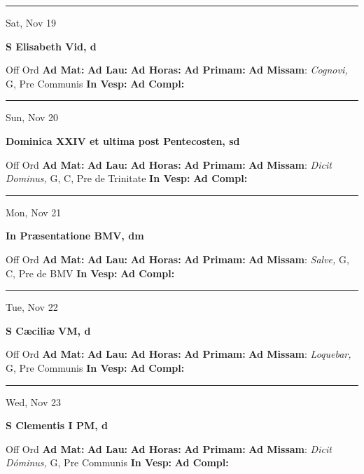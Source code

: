 \documentclass[letterpaper, 10pt]{article}
\begin{document}
\hrule
\begin{center}
Sat, Nov 19
\end{center}\textbf{ \large S Elisabeth Vid, \textnormal{\normalsize d}}
\begin{justify}
Off Ord
\textbf{Ad Mat: }
\textbf{Ad Lau: }
\textbf{Ad Horas: }
\textbf{Ad Primam: }
\textbf{Ad Missam}: \textit{Cognovi,} G, Pre Communis
\textbf{In Vesp: }
\textbf{Ad Compl: }\end{justify}



\hrule
\begin{center}
Sun, Nov 20
\end{center}\textbf{ \large Dominica XXIV et ultima post Pentecosten, \textnormal{\normalsize sd}}
\begin{justify}
Off Ord
\textbf{Ad Mat: }
\textbf{Ad Lau: }
\textbf{Ad Horas: }
\textbf{Ad Primam: }
\textbf{Ad Missam}: \textit{Dicit Dominus,} G, C, Pre de Trinitate
\textbf{In Vesp: }
\textbf{Ad Compl: }\end{justify}



\hrule
\begin{center}
Mon, Nov 21
\end{center}\textbf{ \large In Præsentatione BMV, \textnormal{\normalsize dm}}
\begin{justify}
Off Ord
\textbf{Ad Mat: }
\textbf{Ad Lau: }
\textbf{Ad Horas: }
\textbf{Ad Primam: }
\textbf{Ad Missam}: \textit{Salve,} G, C, Pre de BMV
\textbf{In Vesp: }
\textbf{Ad Compl: }\end{justify}



\hrule
\begin{center}
Tue, Nov 22
\end{center}\textbf{ \large S Cæciliæ VM, \textnormal{\normalsize d}}
\begin{justify}
Off Ord
\textbf{Ad Mat: }
\textbf{Ad Lau: }
\textbf{Ad Horas: }
\textbf{Ad Primam: }
\textbf{Ad Missam}: \textit{Loquebar,} G, Pre Communis
\textbf{In Vesp: }
\textbf{Ad Compl: }\end{justify}



\hrule
\begin{center}
Wed, Nov 23
\end{center}\textbf{ \large S Clementis I PM, \textnormal{\normalsize d}}
\begin{justify}
Off Ord
\textbf{Ad Mat: }
\textbf{Ad Lau: }
\textbf{Ad Horas: }
\textbf{Ad Primam: }
\textbf{Ad Missam}: \textit{Dicit Dóminus,} G, Pre Communis
\textbf{In Vesp: }
\textbf{Ad Compl: }\end{justify}
\end{document}
